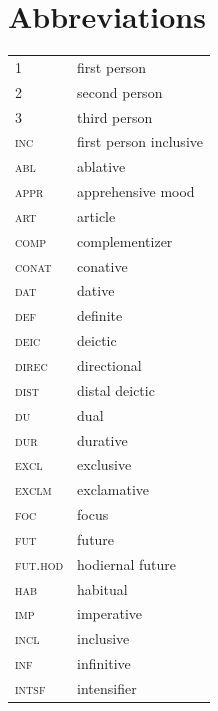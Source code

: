 \documentclass[output=paper,colorlinks,citecolor=brown]{langscibook}
\begin{document}
\section*{Abbreviations}
\begin{tabularx}{.5\textwidth}{@{}lQ@{}}
\textsc{1} & first person\\
\textsc{2} & second person\\
\textsc{3} & third person\\
\textsc{inc} & first person inclusive\\
\textsc{abl} & ablative \\
\textsc{appr} & apprehensive mood \\
\textsc{art} & article\\
\textsc{comp} & complementizer \\
\textsc{conat} & conative \\
\textsc{dat} & dative\\
\textsc{def} & definite \\
\textsc{deic} & deictic \\
\textsc{direc} & directional \\
\textsc{dist} & distal deictic \\
\textsc{du} & dual \\
\textsc{dur} & durative \\
\textsc{excl} & exclusive\\
\textsc{exclm} & exclamative \\
\textsc{foc} & focus \\
\textsc{fut} & future \\
\textsc{fut.hod} & hodiernal future \\
\textsc{hab} & habitual \\
\textsc{imp} & imperative \\
\textsc{incl} & inclusive \\
\textsc{inf} & infinitive \\
\textsc{intsf} & intensifier\end{tabularx}%
\end{document}
